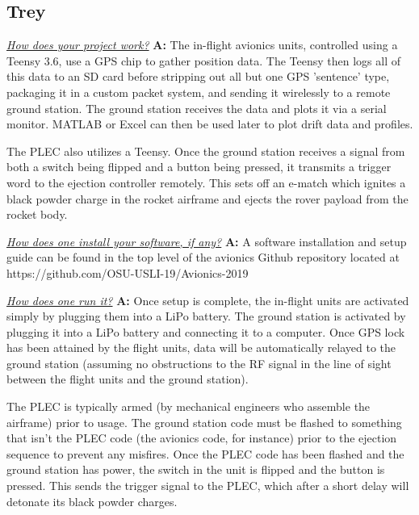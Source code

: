 \documentclass[onecolumn, draftclsnofoot, 10pt, compsoc]{IEEEtran}
\begin{document}
\subsection{Trey}
\textit{\underline{How does your project work?}}
\newline\textbf{A:}  The in-flight avionics units, controlled using a Teensy 3.6, use a GPS chip to gather position data. The Teensy then logs all of this data to an SD card before stripping out all but one GPS 'sentence' type, packaging it in a custom packet system, and sending it wirelessly to a remote ground station. The ground station receives the data and plots it via a serial monitor. MATLAB or Excel can then be used later to plot drift data and profiles. \newline

The PLEC also utilizes a Teensy. Once the ground station receives a signal from both a switch being flipped and a button being pressed, it transmits a trigger word to the ejection controller remotely. This sets off an e-match which ignites a black powder charge in the rocket airframe and ejects the rover payload from the rocket body. \newline

\textit{\underline{How does one install your software, if any?}}
\newline\textbf{A:} A software installation and setup guide can be found in the top level of the avionics Github repository located at https://github.com/OSU-USLI-19/Avionics-2019 \newline

\textit{\underline{How does one run it?}}
\newline\textbf{A:} Once setup is complete, the in-flight units are activated simply by plugging them into a LiPo battery. The ground station is activated by plugging it into a LiPo battery and connecting it to a computer. Once GPS lock has been attained by the flight units, data will be automatically relayed to the ground station (assuming no obstructions to the RF signal in the line of sight between the flight units and the ground station).\newline

The PLEC is typically armed (by mechanical engineers who assemble the airframe) prior to usage. The ground station code must be flashed to something that isn't the PLEC code (the avionics code, for instance) prior to the ejection sequence to prevent any misfires. Once the PLEC code has been flashed and the ground station has power, the switch in the unit is flipped and the button is pressed. This sends the trigger signal to the PLEC, which after a short delay will detonate its black powder charges. \newline
\end{document}
